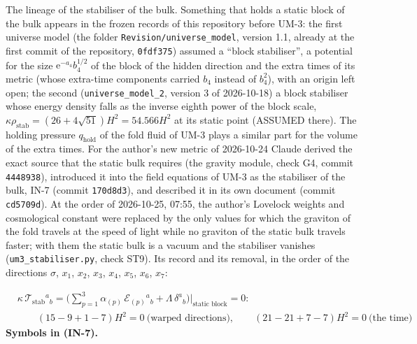 \documentclass[
  10pt,
]{article}
\begin{document}
The lineage of the stabiliser of the bulk. Something that holds a static
block of the bulk appears in the frozen records of this repository
before UM-3: the first universe model (the folder
\texttt{Revision/universe\_model}, version 1.1, already at the first
commit of the repository, \texttt{0fdf375}) assumed a ``block
stabiliser'', a potential for the size \(\mathrm{e}^{-a_4}b_4^{1/2}\) of
the block of the hidden direction and the extra times of its metric
(whose extra-time components carried \(b_4\) instead of \(b_4^2\)), with
an origin left open; the second (\texttt{universe\_model\_2}, version 3
of 2026-10-18) a block stabiliser whose energy density falls as the
inverse eighth power of the block scale,
\(\kappa\rho_{\mathrm{stab}} = (26 + 4\sqrt{51})H^2 = 54.566H^2\) at its
static point (ASSUMED there). The holding pressure \(q_{\mathrm{hold}}\)
of the fold fluid of UM-3 plays a similar part for the volume of the
extra times. For the author's new metric of 2026-10-24 Claude derived
the exact source that the static bulk requires (the gravity module,
check G4, commit \texttt{4448938}), introduced it into the field
equations of UM-3 as the stabiliser of the bulk, IN-7 (commit
\texttt{170d8d3}), and described it in its own document (commit
\texttt{cd5709d}). At the order of 2026-10-25, 07:55, the author's
Lovelock weights and cosmological constant were replaced by the only
values for which the graviton of the fold travels at the speed of light
while no graviton of the static bulk travels faster; with them the
static bulk is a vacuum and the stabiliser vanishes
(\texttt{um3\_stabiliser.py}, check ST9). Its record and its removal, in
the order of the directions \(\sigma\), \(x_1\), \(x_2\), \(x_3\),
\(x_4\), \(x_5\), \(x_6\), \(x_7\):

\[
\begin{aligned}
&\kappa\,\mathcal{T}_{\mathrm{stab}}{}^a{}_b = \Big(\sum_{p=1}^{3}\alpha_{(p)}\,\mathcal{E}_{(p)}{}^a{}_b + \Lambda\,\delta^a{}_b\Big)\Big\vert_{\text{static block}} = 0:\\
&\qquad (15 - 9 + 1 - 7)H^2 = 0\ \text{(warped directions)},\qquad (21 - 21 + 7 - 7)H^2 = 0\ \text{(the time)}
\end{aligned} \tag{IN-7}
\] \textbf{Symbols in (IN-7).}
\end{document}
